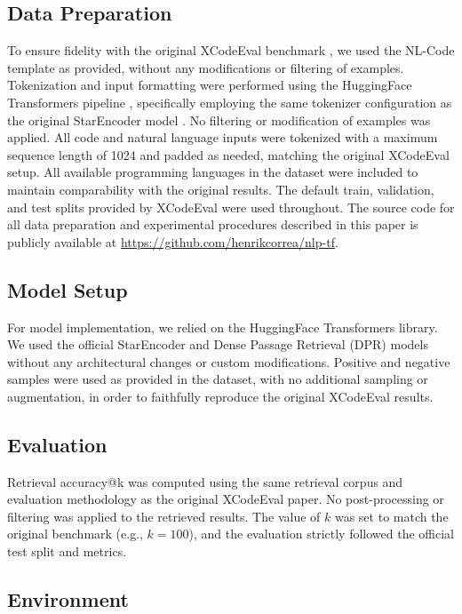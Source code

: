 \documentclass[12pt]{article}
\begin{document}
\subsection{Data Preparation}

To ensure fidelity with the original XCodeEval benchmark \cite{Khan2023}, we used the NL-Code template as provided, without any modifications or filtering of examples. Tokenization and input formatting were performed using the HuggingFace Transformers pipeline \cite{Wolf2020}, specifically employing the same tokenizer configuration as the original StarEncoder model \cite{Li2023}. No filtering or modification of examples was applied. All code and natural language inputs were tokenized with a maximum sequence length of 1024 and padded as needed, matching the original XCodeEval setup. All available programming languages in the dataset were included to maintain comparability with the original results. The default train, validation, and test splits provided by XCodeEval were used throughout. The source code for all data preparation and experimental procedures described in this paper is publicly available at \url{https://github.com/henrikcorrea/nlp-tf}.

\subsection{Model Setup}

For model implementation, we relied on the HuggingFace Transformers library. We used the official StarEncoder and Dense Passage Retrieval (DPR) models \cite{Karpukhin2020} without any architectural changes or custom modifications. Positive and negative samples were used as provided in the dataset, with no additional sampling or augmentation, in order to faithfully reproduce the original XCodeEval results.

\subsection{Evaluation}

Retrieval accuracy@k was computed using the same retrieval corpus and evaluation methodology as the original XCodeEval paper. No post-processing or filtering was applied to the retrieved results. The value of $k$ was set to match the original benchmark (e.g., $k=100$), and the evaluation strictly followed the official test split and metrics.

\subsection{Environment}
\end{document}
